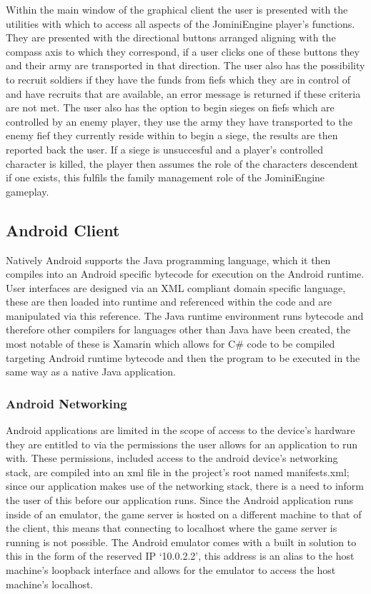 \documentclass{article}
\begin{document}
Within the main window of the graphical client the user is presented with the utilities with which to access all aspects of the JominiEngine player's functions. They are presented with the directional buttons arranged aligning with the compass axis to which they correspond, if a user clicks one of these buttons they and their army are transported in that direction. The user also has the possibility to recruit soldiers if they have the funds from fiefs which they are in control of and have recruits that are available, an error message is returned if these criteria are not met. The user also has the option to begin sieges on fiefs which are controlled by an enemy player, they use the army they have transported to the enemy fief they currently reside within to begin a siege, the results are then reported back the user. If a siege is unsuccesful and a player's controlled character is killed, the player then assumes the role of the characters descendent if one exists, this fulfils the family management role of the JominiEngine gameplay.
\subsection{Android Client }

Natively Android supports the Java programming language, which it then compiles into an Android specific bytecode for execution on the Android runtime. User interfaces are designed via an XML compliant domain specific language, these are then loaded into runtime and referenced within the code and are manipulated via this reference. The Java runtime environment runs bytecode and therefore other compilers for languages other than Java have been created, the most notable of these is Xamarin which allows for C\# code to be compiled targeting Android runtime bytecode and then the program to be executed in the same way as a native Java application.

\subsubsection{Android Networking}

Android applications are limited in the scope of access to the device’s hardware they are entitled to via the permissions the user allows for an application to run with. These permissions, included access to the android device’s networking stack, are compiled into an xml file in the project’s root named manifests.xml; since our application makes use of the networking stack, there is a need to inform the user of this before our application runs. Since the Android application runs inside of an emulator, the game server is hosted on a different machine to that of the client, this means that connecting to localhost where the game server is running is not possible. The Android emulator comes with a built in solution to this in the form of the reserved IP ‘10.0.2.2’, this address is an alias to the host machine’s loopback interface and allows for the emulator to access the host machine’s localhost.
\end{document}
